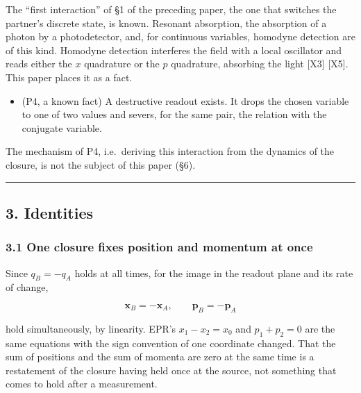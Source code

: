 \documentclass[
  a4paper,
]{article}
\providecommand{\tightlist}{%
  \setlength{\itemsep}{0pt}\setlength{\parskip}{0pt}}
\begin{document}
The ``first interaction'' of §1 of the preceding paper, the one that
switches the partner's discrete state, is known. Resonant absorption,
the absorption of a photon by a photodetector, and, for continuous
variables, homodyne detection are of this kind. Homodyne detection
interferes the field with a local oscillator and reads either the \(x\)
quadrature or the \(p\) quadrature, absorbing the light {[}X3{]}
{[}X5{]}. This paper places it as a fact.

\begin{itemize}
\tightlist
\item
  (P4, a known fact) A destructive readout exists. It drops the chosen
  variable to one of two values and severs, for the same pair, the
  relation with the conjugate variable.
\end{itemize}

The mechanism of P4, i.e.~deriving this interaction from the dynamics of
the closure, is not the subject of this paper (§6).

\begin{center}\rule{0.5\linewidth}{0.5pt}\end{center}

\subsection{3. Identities}\label{identities}

\subsubsection{3.1 One closure fixes position and momentum at
once}\label{one-closure-fixes-position-and-momentum-at-once}

Since \(q_B=-q_A\) holds at all times, for the image in the readout
plane and its rate of change,

\[
\boldsymbol{x}_B=-\boldsymbol{x}_A,\qquad \boldsymbol{p}_B=-\boldsymbol{p}_A
\]

hold simultaneously, by linearity. EPR's \(x_1-x_2=x_0\) and
\(p_1+p_2=0\) are the same equations with the sign convention of one
coordinate changed. That the sum of positions and the sum of momenta are
zero at the same time is a restatement of the closure having held once
at the source, not something that comes to hold after a measurement.
\end{document}

